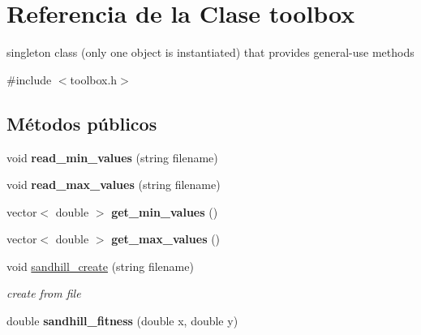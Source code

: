 \hypertarget{classtoolbox}{\section{Referencia de la Clase toolbox}
\label{classtoolbox}
}


singleton class (only one object is instantiated) that provides general-\/use methods  




{\ttfamily \#include $<$toolbox.\+h$>$}

\subsection*{Métodos públicos}
\begin{DoxyCompactItemize}
\item 
\hypertarget{classtoolbox_aeccc47e3554b49d0077cd6a1967bf8e8}{void {\bfseries read\+\_\+min\+\_\+values} (string filename)}\label{classtoolbox_aeccc47e3554b49d0077cd6a1967bf8e8}

\item 
\hypertarget{classtoolbox_a70936376f353e24a4a9c98d77d8618b5}{void {\bfseries read\+\_\+max\+\_\+values} (string filename)}\label{classtoolbox_a70936376f353e24a4a9c98d77d8618b5}

\item 
\hypertarget{classtoolbox_ae211afebb8cbf64ad2782cfed4cf80dc}{vector$<$ double $>$ {\bfseries get\+\_\+min\+\_\+values} ()}\label{classtoolbox_ae211afebb8cbf64ad2782cfed4cf80dc}

\item 
\hypertarget{classtoolbox_a00d9224a5611a483523740ff63c88775}{vector$<$ double $>$ {\bfseries get\+\_\+max\+\_\+values} ()}\label{classtoolbox_a00d9224a5611a483523740ff63c88775}

\item 
\hypertarget{classtoolbox_ab447abb1ad0631aa7f9165e447d4b1db}{void \hyperlink{classtoolbox_ab447abb1ad0631aa7f9165e447d4b1db}{sandhill\+\_\+create} (string filename)}\label{classtoolbox_ab447abb1ad0631aa7f9165e447d4b1db}

\begin{DoxyCompactList}\small\item\em create from file \end{DoxyCompactList}\item 
\hypertarget{classtoolbox_a153ecab8241cbbb42d32931d580191c4}{double {\bfseries sandhill\+\_\+fitness} (double x, double y)}\label{classtoolbox_a153ecab8241cbbb42d32931d580191c4}


\end{DoxyCompactItemize}
